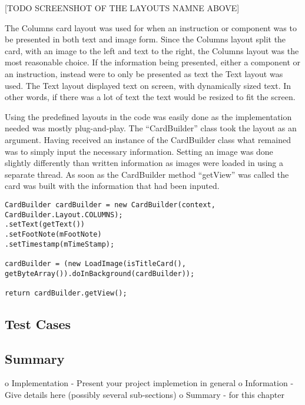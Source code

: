 [TODO SCREENSHOT OF THE LAYOUTS NAMNE ABOVE]

The Columns card layout was used for when an instruction or component was to be presented in both text and image form. Since the Columns layout split the card, with an image to the left and text to the right, the Columns layout was the most reasonable choice. If the information being presented, either a component or an instruction, instead were to only be presented as text the Text layout was used. The Text layout displayed text on screen, with dynamically sized text. In other words, if there was a lot of text the text would be resized to fit the screen.

Using the predefined layouts in the code was easily done as the implementation needed was mostly plug-and-play. The ``CardBuilder'' class took the layout as an argument. Having received an instance of the CardBuilder class what remained was to simply input the necessary information. Setting an image was done slightly differently than written information as images were loaded in using a separate thread. As soon as the CardBuilder method ``getView'' was called the card was built with the information that had been inputed.

\begin{lstlisting}
CardBuilder cardBuilder = new CardBuilder(context, CardBuilder.Layout.COLUMNS);
.setText(getText())
.setFootNote(mFootNote)
.setTimestamp(mTimeStamp);

cardBuilder = (new LoadImage(isTitleCard(), getByteArray()).doInBackground(cardBuilder));

return cardBuilder.getView();
\end{lstlisting}



\subsection{Test Cases}


\subsection{Summary}
\label{subsec:summary}


o   Implementation - Present your project implemetion in general
o   Information - Give details here (possibly several sub-sections)
o   Summary - for this chapter

% 

